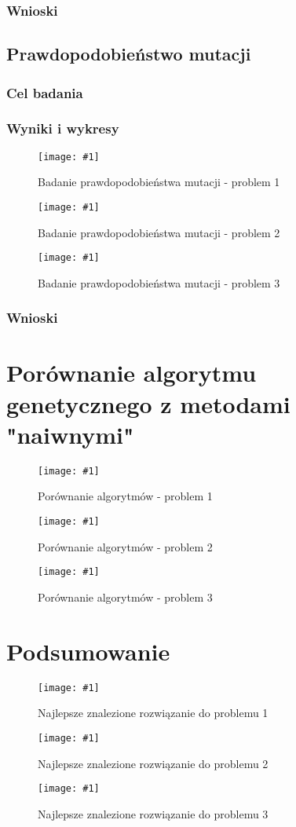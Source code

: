 \documentclass[12pt,a4paper]{article}
\newcommand{\image}[2] {
    \begin{figure}[H]
        \begin{center}
            \texttt{[image: \#1]}
        \end{center}
        \caption{#2}
        \label{#1}
    \end{figure}
}
\begin{document}
\subsubsection{Wnioski}
\subsection{Prawdopodobieństwo mutacji}
\subsubsection{Cel badania}
\subsubsection{Wyniki i wykresy}
\image{images/Badanie p. mutacji_1}{Badanie prawdopodobieństwa mutacji - problem 1}
\image{images/Badanie p. mutacji_2}{Badanie prawdopodobieństwa mutacji - problem 2}
\image{images/Badanie p. mutacji_3}{Badanie prawdopodobieństwa mutacji - problem 3}
\subsubsection{Wnioski}
\section{Porównanie algorytmu genetycznego z metodami "naiwnymi"}
\image{images/Porównanie algorytmów_1}{Porównanie algorytmów - problem 1}
\image{images/Porównanie algorytmów_2}{Porównanie algorytmów - problem 2}
\image{images/Porównanie algorytmów_3}{Porównanie algorytmów - problem 3}

\section{Podsumowanie}
\image{images/solution1}{Najlepsze znalezione rozwiązanie do problemu 1}
\image{images/solution2}{Najlepsze znalezione rozwiązanie do problemu 2}
\image{images/solution3}{Najlepsze znalezione rozwiązanie do problemu 3}
\end{document}

